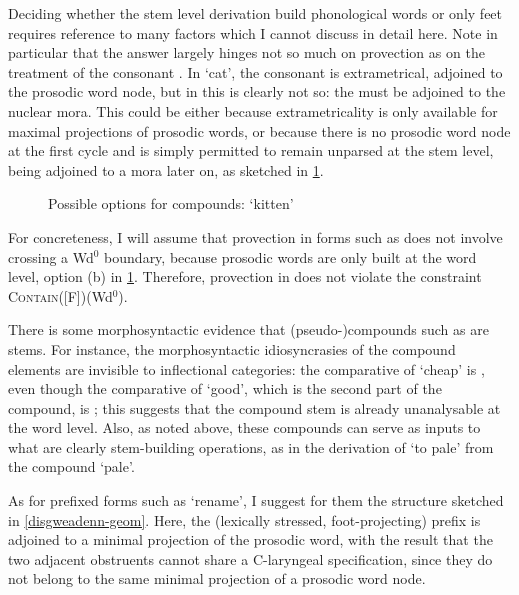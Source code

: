 Deciding whether the stem level derivation build phonological words or only feet requires reference to many factors which I cannot discuss in detail here. Note in particular that the answer largely hinges not so much on provection as on the treatment of the consonant . In \ipa{[ˈkaːz̥]} `cat', the consonant is extrametrical, \ie adjoined to the prosodic word node, but in \ipa{[ˌkasˈpjan]} this is clearly not so: the \ipa{[s]} must be adjoined to the nuclear mora. This could be either because extrametricality is only available for maximal projections of prosodic words, or because there is no prosodic word node at the first cycle and \ipa{[z]} is simply permitted to remain unparsed at the stem level, being adjoined to a mora later on, as sketched in \cref{fig:kazh-bihan}.

\begin{figure}[htp]
  \centering
  \caption{Possible options for compounds: \ipa{[ˌkasˈpjan]} `kitten'}
  \label{fig:kazh-bihan}
\end{figure}

For concreteness, I will assume that provection in forms such as \mbox{\ipa{[ˌkasˈpjan]}} does not involve crossing a Wd$^{0}$ boundary, because prosodic words are only built at the word level, \ie option (b) in \cref{fig:kazh-bihan}. Therefore, provection in \mbox{\ipa{[ˌkasˈpjan]}} does not violate the constraint \textsc{Contain}([F])(Wd$^{0}$).

There is some morphosyntactic evidence that (pseudo-)compounds such as \mbox{\ipa{[ˌkasˈpjan]}} are stems. For instance, the morphosyntactic idiosyncrasies of the compound elements are invisible to inflectional categories: the comparative of \ipa{[ˌmahaˈmaːd̥]} `cheap' is \ipa{[ˌmahaˈmatɒh]}, even though the comparative of \ipa{[ˈmaːd̥]} `good', which is the second part of the compound, is \ipa{[ˈdʒɥɛlɒh]}; this suggests that the compound stem is already unanalysable at the word level. Also, as noted above, these compounds can serve as inputs to what are clearly stem-building operations, as in the derivation of \ipa{[ˌliːvəˈfalad̥]} `to pale' from the compound \ipa{[ˌliːvəˈfal]} `pale'.

As for prefixed forms such as \ipa{[ˌdizˈvaːdio]} `rename', I suggest for them the structure sketched in \ref{disgweadenn-geom}. Here, the (lexically stressed, \ie foot\hyp projecting) prefix  is adjoined to a minimal projection of the prosodic word, with the result that the two adjacent obstruents cannot share a C-laryngeal specification, since they do not belong to the same minimal projection of a prosodic word node.

